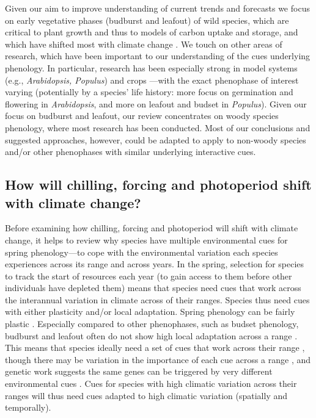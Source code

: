 \documentclass[11pt,letter]{article}
\begin{document}
Given our aim to improve understanding of current trends and forecasts we focus on early vegetative phases (budburst and leafout) of wild species, which are critical to plant growth and thus to models of carbon uptake and storage, and which have shifted most with climate change \citep{Cleland:2007or,IPCC:2014sm}. We touch on other areas of research, which have been important to our understanding of the cues underlying phenology. In particular, research has been especially strong in model systems (e.g., \emph{Arabidopsis, Populus}) and crops \citep{cesaraccio2004}---with the exact phenophase of interest varying (potentially by a species' life history: more focus on germination and flowering in \emph{Arabidopsis}, and more on leafout and budset in \emph{Populus}).  Given our focus on budburst and leafout, our review concentrates on woody species phenology, where most research has been conducted. Most of our conclusions and suggested approaches, however, could be adapted to apply to non-woody species and/or other phenophases with similar underlying interactive cues. \\


\subsection{How will chilling, forcing and photoperiod shift with climate change?}
Before examining how chilling, forcing and photoperiod will shift with climate change, it helps to review why species have multiple environmental cues for spring phenology---to cope with the environmental variation each species experiences across its range and across years. In the spring, selection for species to track the start of resources each year (to gain access to them before other individuals have depleted them) means that species need cues that work across the interannual variation in climate across of their ranges. Species thus need cues with either plasticity and/or local adaptation. Spring phenology can be fairly plastic \citep{vitasselev,kramer2017}. Especially compared to other phenophases, such as budset phenology, budburst and leafout often do not show high local adaptation across a range \citep{mimura2010}. This means that species ideally need a set of cues that work across their range \citep{liepe2016}, though there may be variation in the importance of each cue across a range \citep[e.g., chilling can be higher in coastal versus continental, see][]{campbell1979}, and genetic work suggests the same genes can be triggered by very different environmental cues \citep[e.g.,][]{simpson2002arab,Stinchcombe:2004ec}. Cues for species with high climatic variation across their ranges will thus need cues adapted to high climatic variation (spatially and temporally).\\ %
\end{document}
